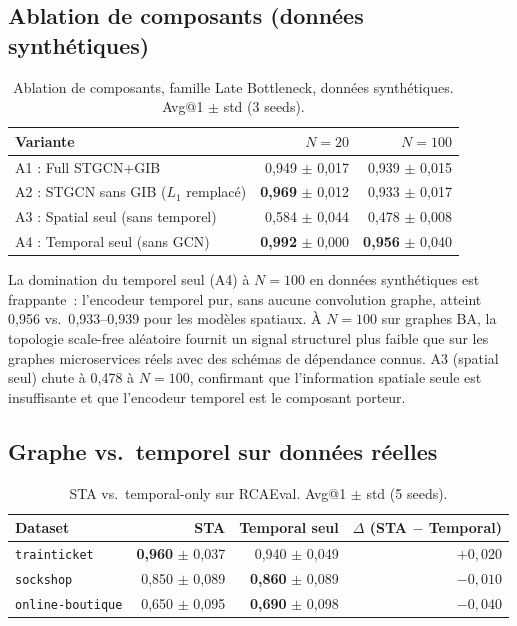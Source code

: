 \documentclass[a4paper,11pt,oneside]{report}
\begin{document}
\subsection{Ablation de composants (donn\'ees synth\'etiques)}

\begin{table}[ht]
\centering
\caption{Ablation de composants, famille Late Bottleneck, donn\'ees synth\'etiques. Avg@1 $\pm$ std (3 seeds).}
\label{tab:ablation-A}
\begin{tabular}{lrr}
\toprule
Variante & $N{=}20$ & $N{=}100$ \\
\midrule
A1 : Full STGCN+GIB & 0{,}949 $\pm$ 0{,}017 & 0{,}939 $\pm$ 0{,}015 \\
A2 : STGCN sans GIB ($L_1$ remplac\'e) & \textbf{0{,}969} $\pm$ 0{,}012 & 0{,}933 $\pm$ 0{,}017 \\
A3 : Spatial seul (sans temporel) & 0{,}584 $\pm$ 0{,}044 & 0{,}478 $\pm$ 0{,}008 \\
A4 : Temporal seul (sans GCN) & \textbf{0{,}992} $\pm$ 0{,}000 & \textbf{0{,}956} $\pm$ 0{,}040 \\
\bottomrule
\end{tabular}
\end{table}

La domination du temporel seul (A4) \`a $N{=}100$ en donn\'ees synth\'etiques est frappante~: l'encodeur temporel pur, sans aucune convolution graphe, atteint 0{,}956 vs.\ 0{,}933--0{,}939 pour les mod\`eles spatiaux. \`A $N{=}100$ sur graphes BA, la topologie scale-free al\'eatoire fournit un signal structurel plus faible que sur les graphes microservices r\'eels avec des sch\'emas de d\'ependance connus. A3 (spatial seul) chute \`a 0{,}478 \`a $N{=}100$, confirmant que l'information spatiale seule est insuffisante et que l'encodeur temporel est le composant porteur.

\subsection{Graphe vs.\ temporel sur donn\'ees r\'eelles}

\begin{table}[ht]
\centering
\caption{STA vs.\ temporal-only sur RCAEval. Avg@1 $\pm$ std (5 seeds).}
\label{tab:ablation-T5}
\begin{tabular}{lrrr}
\toprule
Dataset & STA & Temporal seul & $\Delta$ (STA $-$ Temporal) \\
\midrule
\texttt{trainticket} & \textbf{0{,}960} $\pm$ 0{,}037 & 0{,}940 $\pm$ 0{,}049 & $+0{,}020$ \\
\texttt{sockshop} & 0{,}850 $\pm$ 0{,}089 & \textbf{0{,}860} $\pm$ 0{,}089 & $-0{,}010$ \\
\texttt{online-boutique} & 0{,}650 $\pm$ 0{,}095 & \textbf{0{,}690} $\pm$ 0{,}098 & $-0{,}040$ \\
\bottomrule
\end{tabular}
\end{table}
\end{document}
